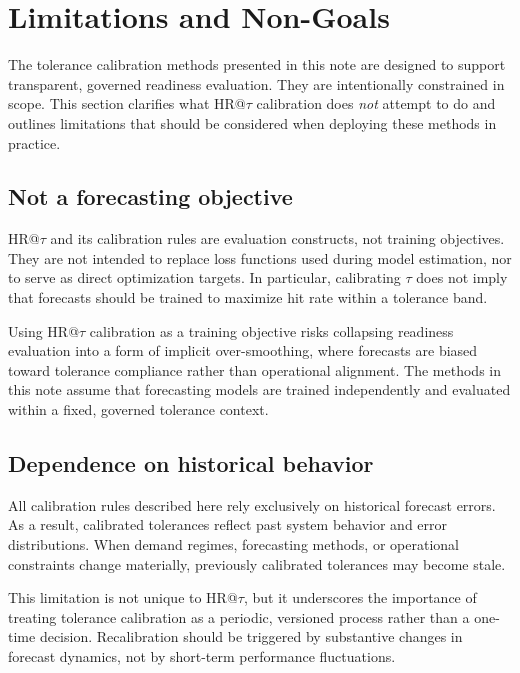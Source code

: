 \section{Limitations and Non-Goals}
\label{sec:limitations}

The tolerance calibration methods presented in this note are designed to support
transparent, governed readiness evaluation.
They are intentionally constrained in scope.
This section clarifies what HR@$\tau$ calibration does \emph{not} attempt to do
and outlines limitations that should be considered when deploying these methods
in practice.

\subsection{Not a forecasting objective}
\label{subsec:not_objective}

HR@$\tau$ and its calibration rules are evaluation constructs, not training
objectives.
They are not intended to replace loss functions used during model estimation,
nor to serve as direct optimization targets.
In particular, calibrating $\tau$ does not imply that forecasts should be
trained to maximize hit rate within a tolerance band.

Using HR@$\tau$ calibration as a training objective risks collapsing readiness
evaluation into a form of implicit over-smoothing, where forecasts are biased
toward tolerance compliance rather than operational alignment.
The methods in this note assume that forecasting models are trained independently
and evaluated within a fixed, governed tolerance context.

\subsection{Dependence on historical behavior}
\label{subsec:historical_dependence}

All calibration rules described here rely exclusively on historical forecast
errors.
As a result, calibrated tolerances reflect past system behavior and error
distributions.
When demand regimes, forecasting methods, or operational constraints change
materially, previously calibrated tolerances may become stale.

This limitation is not unique to HR@$\tau$, but it underscores the importance of
treating tolerance calibration as a periodic, versioned process rather than a
one-time decision.
Recalibration should be triggered by substantive changes in forecast dynamics,
not by short-term performance fluctuations.

